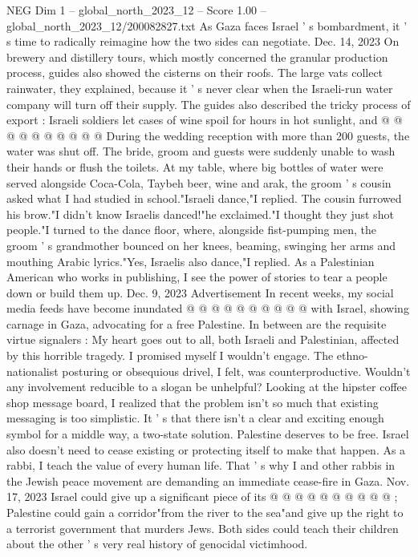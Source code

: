 \begin{textsample}{NEG Dim 1 – global\_north\_2023\_12 – Score 1.00 – global\_north\_2023\_12/200082827.txt}
As Gaza faces Israel ' s bombardment, it ' s time to radically reimagine how the two sides can negotiate.
Dec. 14, 2023 On brewery and distillery tours, which mostly concerned the granular production process, guides also showed the cisterns on their roofs.
The large vats collect rainwater, they explained, because it ' s never clear when the Israeli-run water company will turn off their supply.
The guides also described the tricky process of export : Israeli soldiers let cases of wine spoil for hours in hot sunlight, and @ @ @ @ @ @ @ @ @ @ During the wedding reception with more than 200 guests, the water was shut off.
The bride, groom and guests were suddenly unable to wash their hands or flush the toilets.
At my table, where big bottles of water were served alongside Coca-Cola, Taybeh beer, wine and arak, the groom ' s cousin asked what I had studied in school."Israeli dance,"I replied.
The cousin furrowed his brow."I didn't know Israelis danced!"he exclaimed."I thought they just shot people."I turned to the dance floor, where, alongside fist-pumping men, the groom ' s grandmother bounced on her knees, beaming, swinging her arms and mouthing Arabic lyrics."Yes, Israelis also dance,"I replied.
As a Palestinian American who works in publishing, I see the power of stories to tear a people down or build them up.
Dec. 9, 2023 Advertisement In recent weeks, my social media feeds have become inundated @ @ @ @ @ @ @ @ @ @ with Israel, showing carnage in Gaza, advocating for a free Palestine.
In between are the requisite virtue signalers : My heart goes out to all, both Israeli and Palestinian, affected by this horrible tragedy.
I promised myself I wouldn't engage.
The ethno-nationalist posturing or obsequious drivel, I felt, was counterproductive.
Wouldn't any involvement reducible to a slogan be unhelpful?
Looking at the hipster coffee shop message board, I realized that the problem isn't so much that existing messaging is too simplistic.
It ' s that there isn't a clear and exciting enough symbol for a middle way, a two-state solution.
Palestine deserves to be free.
Israel also doesn't need to cease existing or protecting itself to make that happen.
As a rabbi, I teach the value of every human life.
That ' s why I and other rabbis in the Jewish peace movement are demanding an immediate cease-fire in Gaza.
Nov. 17, 2023 Israel could give up a significant piece of its @ @ @ @ @ @ @ @ @ @ ; Palestine could gain a corridor"from the river to the sea"and give up the right to a terrorist government that murders Jews.
Both sides could teach their children about the other ' s very real history of genocidal victimhood.

\end{textsample}
